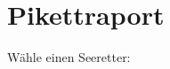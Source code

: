 \documentclass{article}
\begin{document}
	
	\section*{Pikettraport}
	
	\begin{Form}
		
		Wähle einen Seeretter:
		
		\CrewListDropDown
		
		\vspace{1cm}
		
		
	\end{Form}
	
\end{document}
